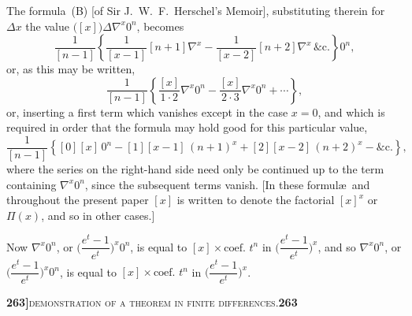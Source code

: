 \documentclass[11pt]{article}
\begin{document}
\medskip

\noindent The formula~(B) [of Sir J.~W.~F.~Herschel's Memoir], substituting therein for $\Delta x$ the value $\bigl([x]\bigr)\Delta\nabla^x 0^n$, becomes
\[
   \frac{1}{[n-1]}\left\{\frac{1}{[x-1]}[n+1]\nabla^x - \frac{1}{[x-2]}[n+2]\nabla^x \,\&\text{c.}\right\}0^n,
\]
or, as this may be written,
\[
   \frac{1}{[n-1]}\left\{\frac{[x]}{1\cdot 2}\nabla^x 0^n - \frac{[x]}{2\cdot 3}\nabla^x 0^n + \cdots\right\},
\]
or, inserting a first term which vanishes except in the case $x = 0$, and which is required in order that the formula may hold good for this particular value,
\[
   \frac{1}{[n-1]}\left\{[0][x]\,0^n - [1][x-1]\,(n+1)^x + [2][x-2]\,(n+2)^x - \&\text{c.}\right\},
\]
where the series on the right-hand side need only be continued up to the term containing $\nabla^x 0^n$, since the subsequent terms vanish. [In these formul\ae\ and throughout the present paper $[x]$ is written to denote the factorial $[x]^x$ or $\Pi(x)$, and so in other cases.]

\medskip

\noindent Now $\nabla^x 0^n$, or $\bigl(\dfrac{e^t - 1}{e^t}\bigr)^x 0^n$, is equal to $[x] \times \text{coef. } t^n$ in $\bigl(\dfrac{e^t - 1}{e^t}\bigr)^x$, and so $\nabla^x 0^n$, or $\bigl(\dfrac{e^t - 1}{e^t}\bigr)^x 0^n$, is equal to $[x] \times \text{coef. } t^n$ in $\bigl(\dfrac{e^t - 1}{e^t}\bigr)^x$.

\newpage
\setcounter{page}{263}

\noindent\textbf{263]}\hfill\textsc{demonstration of a theorem in finite differences.}\hfill\textbf{263}

\medskip
\end{document}
